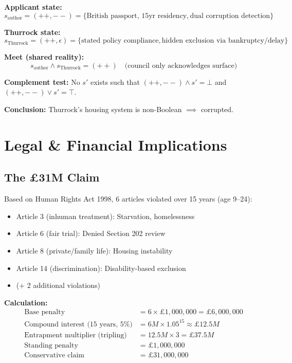 \documentclass[11pt,a4paper]{article}
\theoremstyle{definition}
\begin{document}
\textbf{Applicant state:}
\[
s_{\text{author}} = (++,--) = \{\text{British passport, 15yr residency}, \text{dual corruption detection}\}
\]

\textbf{Thurrock state:}
\[
s_{\text{Thurrock}} = (++,\epsilon) = \{\text{stated policy compliance}, \text{hidden exclusion via bankruptcy/delay}\}
\]

\textbf{Meet (shared reality):}
\[
s_{\text{author}} \wedge s_{\text{Thurrock}} = (++) \quad \text{(council only acknowledges surface)}
\]

\textbf{Complement test:}
No $s'$ exists such that $(++,--) \wedge s' = \bot$ and $(++,--) \vee s' = \top$.

\textbf{Conclusion:} Thurrock's housing system is non-Boolean $\implies$ corrupted.

\section{Legal \& Financial Implications}

\subsection{The £31M Claim}

Based on Human Rights Act 1998, 6 articles violated over 15 years (age 9--24):

\begin{itemize}
    \item Article 3 (inhuman treatment): Starvation, homelessness
    \item Article 6 (fair trial): Denied Section 202 review
    \item Article 8 (private/family life): Housing instability
    \item Article 14 (discrimination): Disability-based exclusion
    \item (+ 2 additional violations)
\end{itemize}

\textbf{Calculation:}
\begin{align*}
\text{Base penalty} &= 6 \times \pounds 1{,}000{,}000 = \pounds 6{,}000{,}000 \\
\text{Compound interest (15 years, 5\%)} &= 6M \times 1.05^{15} \approx \pounds 12.5M \\
\text{Entrapment multiplier (tripling)} &= 12.5M \times 3 = £37.5M \\
\text{Standing penalty} &= £1{,}000{,}000 \\
\text{Conservative claim} &= £31{,}000{,}000
\end{align*}
\end{document}
